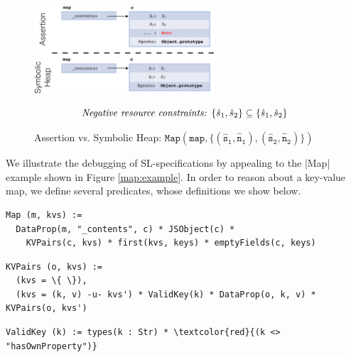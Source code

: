 \begin{figure}[t!]
\centering
\includegraphics[width=0.6\textwidth]{figures/symbvsass.png}

\vspace*{-0.7cm}
{\small $$
\text{\emph{Negative resource constraints: }} \{ \hat{s}_1, \hat{s}_2 \} \subseteq \{ \hat{s}_1, \hat{s}_2 \}
$$}
\vspace{-0.8cm}
\caption{Assertion vs. Symbolic Heap: {\small$\mathtt{Map(map, \{ (\hat{s}_1, \hat{n}_1), (\hat{s}_2, \hat{n}_2) \} )}$}}\label{fig:symb:state:versus:assertion}
\vspace{-0.5cm}
\end{figure}

We illustrate the debugging of SL-specifications by appealing to the \jsinline|Map| example shown in Figure \ref{map:example}. In order to reason about a key-value map,
we define several predicates, whose definitions we show below.

\begin{Verbatim}[fontsize=\footnotesize,commandchars=\\\{\}]
Map (m, kvs) := 
  DataProp(m, "_contents", c) * JSObject(c) * 
    KVPairs(c, kvs) * first(kvs, keys) * emptyFields(c, keys)
\end{Verbatim}
 \begin{Verbatim}[fontsize=\footnotesize,commandchars=\\\{\}]
KVPairs (o, kvs) := 
  (kvs = \{ \}),
  (kvs = (k, v) -u- kvs') * ValidKey(k) * DataProp(o, k, v) * KVPairs(o, kvs')
\end{Verbatim}
\begin{Verbatim}[fontsize=\footnotesize,commandchars=\\\{\}]
ValidKey (k) := types(k : Str) * \textcolor{red}{(k <> "hasOwnProperty")}
\end{Verbatim}

